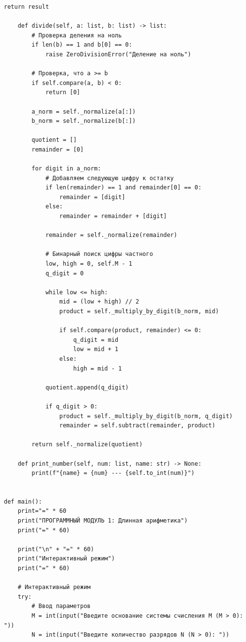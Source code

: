\documentclass{article}[14pt]
\begin{document}
\begin{lstlisting}[caption={Код исправленной программы}, label=lst:fixed-code]
        return result
    
    def divide(self, a: list, b: list) -> list:
        # Проверка деления на ноль
        if len(b) == 1 and b[0] == 0:
            raise ZeroDivisionError("Деление на ноль")
        
        # Проверка, что a >= b
        if self.compare(a, b) < 0:
            return [0]
        
        a_norm = self._normalize(a[:])
        b_norm = self._normalize(b[:])
        
        quotient = []
        remainder = [0]
        
        for digit in a_norm:
            # Добавляем следующую цифру к остатку
            if len(remainder) == 1 and remainder[0] == 0:
                remainder = [digit]
            else:
                remainder = remainder + [digit]
            
            remainder = self._normalize(remainder)
            
            # Бинарный поиск цифры частного
            low, high = 0, self.M - 1
            q_digit = 0
            
            while low <= high:
                mid = (low + high) // 2
                product = self._multiply_by_digit(b_norm, mid)
                
                if self.compare(product, remainder) <= 0:
                    q_digit = mid
                    low = mid + 1
                else:
                    high = mid - 1
            
            quotient.append(q_digit)
            
            if q_digit > 0:
                product = self._multiply_by_digit(b_norm, q_digit)
                remainder = self.subtract(remainder, product)
        
        return self._normalize(quotient)
    
    def print_number(self, num: list, name: str) -> None:
        print(f"{name} = {num} --- {self.to_int(num)}")


def main():
    print="=" * 60
    print("ПРОГРАММНЫЙ МОДУЛЬ 1: Длинная арифметика")
    print("=" * 60)
    
    print("\n" + "=" * 60)
    print("Интерактивный режим")
    print("=" * 60)
    
    # Интерактивный режим
    try:
        # Ввод параметров
        M = int(input("Введите основание системы счисления M (M > 0): "))
        N = int(input("Введите количество разрядов N (N > 0): "))
        

\end{lstlisting}
\end{document}
